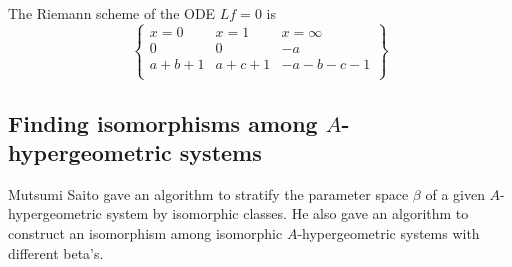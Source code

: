 \documentclass{article}
\begin{document}
The Riemann scheme of the ODE $L f = 0$ is
\begin{equation}
 \left\{
  \begin{array}{ccc}
   x=0 & x=1 & x=\infty \\
    0  &   0 & -a \\
  a+b+1&a+c+1&-a-b-c-1 \\
  \end{array}
 \right\}
\end{equation}



\subsection{Finding isomorphisms among $A$-hypergeometric systems}

Mutsumi Saito \cite{saito-isom} 
gave an algorithm to stratify the parameter space
$\beta$ of a given $A$-hypergeometric system by isomorphic classes.
He also gave an algorithm to construct an isomorphism among
isomorphic $A$-hypergeometric systems with different beta's.
\end{document}

